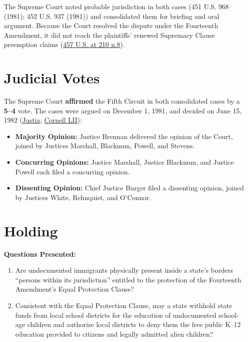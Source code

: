 \documentclass[12pt]{article}
\begin{document}
The Supreme Court noted probable jurisdiction in both cases (451 U.S. 968 (1981); 452 U.S. 937 (1981)) and consolidated them for briefing and oral argument. Because the Court resolved the dispute under the Fourteenth Amendment, it did not reach the plaintiffs' renewed Supremacy Clause preemption claims (\href{https://www.law.cornell.edu/supremecourt/text/457/202}{457 U.S. at 210 n.8}).

\section{Judicial Votes}
The Supreme Court \textbf{affirmed} the Fifth Circuit in both consolidated cases by a \textbf{5--4} vote. The cases were argued on December 1, 1981, and decided on June 15, 1982 (\href{https://supreme.justia.com/cases/federal/us/457/202/}{Justia}; \href{https://www.law.cornell.edu/supremecourt/text/457/202}{Cornell LII}):

\begin{itemize}
    \item \textbf{Majority Opinion:} Justice Brennan delivered the opinion of the Court, joined by Justices Marshall, Blackmun, Powell, and Stevens.
    \item \textbf{Concurring Opinions:} Justice Marshall, Justice Blackmun, and Justice Powell each filed a concurring opinion.
    \item \textbf{Dissenting Opinion:} Chief Justice Burger filed a dissenting opinion, joined by Justices White, Rehnquist, and O'Connor.
\end{itemize}

\section{Holding}
\textbf{Questions Presented:}

\begin{enumerate}
    \item Are undocumented immigrants physically present inside a state's borders ``persons within its jurisdiction'' entitled to the protection of the Fourteenth Amendment's Equal Protection Clause?
    \item Consistent with the Equal Protection Clause, may a state withhold state funds from local school districts for the education of undocumented school-age children and authorize local districts to deny them the free public K--12 education provided to citizens and legally admitted alien children?
\end{enumerate}
\end{document}
